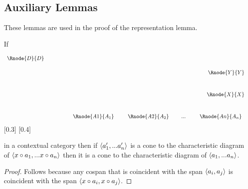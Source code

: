 \documentclass[10pt,a4paper]{scrartcl}
\begin{document}
\subsection{Auxiliary Lemmas}
These lemmas are used in the proof of the representation lemma.
\begin{lemma}
If 
\begin{center}
\begin{displaymath}
\begin{array}{c p{1cm} r  }
\Rnode{D}{D} \\[0.5cm]
&&\Rnode{Y}{Y}\\[1.0cm]
&&\Rnode{X}{X}\\[1.0cm]
&&\begin{array}{c p{0.2cm} c p{0.1cm}c p{0.2cm} c}
\Rnode{A1}{A_1}& & \Rnode{A2}{A_2}&   & ... & & \Rnode{An}{A_n}
\end{array}                             
\end{array} 
\end{displaymath}
[0.3]
[0.4]
\end{center}
in a contextual category \ccat then if $\langle a'_1,...a'_n\rangle$ is a cone to the characteristic diagram 
of $\langle x \circ a_1,... x \circ a_n\rangle$ then it is a cone to the characteristic diagram
of $\langle a_1,... a_n\rangle$.
\end{lemma}
\begin{proof}
Follows because any cospan that is coincident with the span $\langle a_i,a_j\rangle$
is coincident with the span $\langle x \circ a_i, x \circ a_j\rangle$.
\end{proof}
\end{document}
